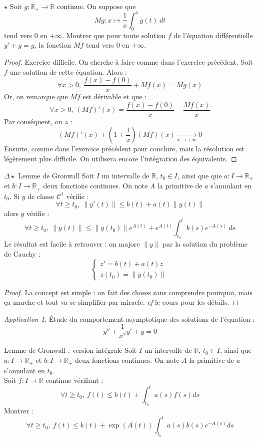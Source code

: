 \documentclass[french,a4paper]{article}
\newcommand{\R}{\mathbb{R}}
\theoremstyle{plain}
\theoremstyle{definition}
\theoremstyle{remark}
\newtheorem*{app}{Application}
\begin{document}
\begin{ex}[Moulin.31]{$\star$}
	Soit $g:\R_+\to\R$ continue. On suppose que $$Mg:x\mapsto\frac{1}{x}\int_{0}^{x}g(t)\ dt$$ tend vers $0$ en $+\infty$. Montrer que pour toute solution $f$ de l'équation différentielle $y'+y=g$, la fonction $Mf$ tend vers $0$ en $+\infty$.
\end{ex}
\begin{proof}
	Exercice difficile. On cherche à faire comme dans l'exercice précédent. Soit $f$ une solution de cette équation. Alors : $$\forall x>0,\ \frac{f(x)-f(0)}{x}+Mf(x)=Mg(x)$$ Or, on remarque que $Mf$ est dérivable et que : $$\forall x>0,\ (Mf)'(x)=\frac{f(x)-f(0)}{x}-\frac{Mf(x)}{x}$$ Par conséquent, on a : $$(Mf)'(x)+\left(1+\frac{1}{x}\right)(Mf)(x)\xrightarrow[x\to+\infty]{}0$$ Ensuite, comme dans l'exercice précédent pour conclure, mais la résolution est légèrement plus difficile. On utilisera encore l'intégration des équivalents.
\end{proof}

\begin{ex}{$\Delta\star$ Lemme de Gronwall}
	Soit $I$ un intervalle de $\R$, $t_0\in I$, ainsi que que $a:I\to\R_+$ et $b:I\to\R_+$ deux fonctions continues. On note $A$ la primitive de $a$ s'annulant en $t_0$. Si $y$ de classe $\mathcal{C}^1$ vérifie : $$\forall t\geqslant t_0,\ \lVert y'(t)\rVert\leqslant b(t)+a(t)\lVert y(t)\rVert$$ alors $y$ vérifie : $$\forall t\geqslant t_0,\ \lVert y(t)\rVert\leqslant\lVert y(t_0)\rVert e^{A(t)}+e^{A(t)}\int_{t_0}^{t}b(s)e^{-A(s)}\ ds$$ Le résultat est facile à retrouver : on majore $\lVert y\rVert$ par la solution du problème de Cauchy : $$\begin{cases}
		z'=b(t)+a(t)z \\
		z(t_0)=\lVert y(t_0)\rVert
	\end{cases}$$
\end{ex}
\begin{proof}
	La concept est simple : on fait des choses sans comprendre pourquoi, mais ça marche et tout va se simplifier par miracle. \textit{cf} le cours pour les détails.
\end{proof}
\begin{app}
	Étude du comportement asymptotique des solutions de l'équation : $$y''+\frac{1}{x^2}y'+y=0$$
\end{app}

\begin{ex}[Moulin.41]{Lemme de Gronwall : version intégrale}
	Soit $I$ un intervalle de $\R$, $t_0\in I$, ainsi que $a:I\to\R_+$ et $b:I\to\R_+$ deux fonctions continues. On note $A$ la primitive de $a$ s'annulant en $t_0$. \\
	Soit $f:I\to\R$ continue vérifiant : $$\forall t\geqslant t_0,\ f(t)\leqslant b(t)+\int_{t_0}^{t}a(s)f(s)ds$$ Montrer : $$\forall t\geqslant t_0,\ f(t)\leqslant b(t)+\exp(A(t))\int_{t_0}^{t}a(s)b(s)e^{-A(s)}ds$$
\end{ex}
\end{document}
